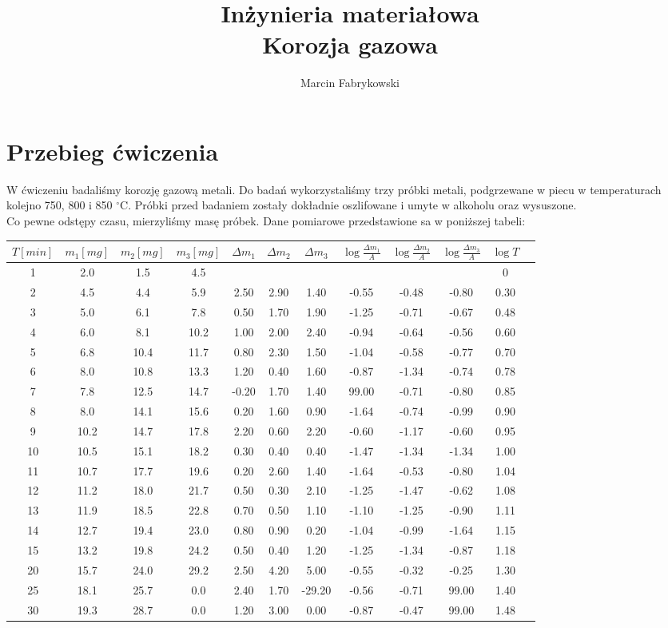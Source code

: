 \documentclass[a4paper,12pt]{article}
\author{Marcin Fabrykowski}
\title{Inżynieria materiałowa\\Korozja gazowa}
\begin{document}
\maketitle
\newpage
\section{Przebieg ćwiczenia}
W ćwiczeniu badaliśmy korozję gazową metali. Do badań wykorzystaliśmy trzy próbki metali, podgrzewane w piecu w temperaturach kolejno 750, 800 i 850 $^{\circ}$C. Próbki przed badaniem zostały dokładnie oszlifowane i umyte w alkoholu oraz wysuszone.\\
Co pewne odstępy czasu, mierzyliśmy masę próbek. Dane pomiarowe przedstawione sa w poniższej tabeli:\\
\small
\begin{tabular}{|c|c|c|c|c|c|c|c|c|c|c|c|}
\hline
$T[min]$&$m_1[mg]$&$m_2[mg]$&$m_3[mg]$&$\Delta m_1$&$\Delta m_2$&$\Delta m_3$&$\log\frac{\Delta m_1}{A}$&$\log\frac{\Delta m_2}{A}$&$\log\frac{\Delta m_3}{A}$&$\log T$\\
\hline
1&2.0&1.5&4.5&&&&&&&0\\
2&4.5&4.4&5.9&2.50&2.90&1.40&-0.55&-0.48&-0.80&0.30\\
3&5.0&6.1&7.8&0.50&1.70&1.90&-1.25&-0.71&-0.67&0.48\\
4&6.0&8.1&10.2&1.00&2.00&2.40&-0.94&-0.64&-0.56&0.60\\
5&6.8&10.4&11.7&0.80&2.30&1.50&-1.04&-0.58&-0.77&0.70\\
6&8.0&10.8&13.3&1.20&0.40&1.60&-0.87&-1.34&-0.74&0.78\\
7&7.8&12.5&14.7&-0.20&1.70&1.40&99.00&-0.71&-0.80&0.85\\
8&8.0&14.1&15.6&0.20&1.60&0.90&-1.64&-0.74&-0.99&0.90\\
9&10.2&14.7&17.8&2.20&0.60&2.20&-0.60&-1.17&-0.60&0.95\\
10&10.5&15.1&18.2&0.30&0.40&0.40&-1.47&-1.34&-1.34&1.00\\
11&10.7&17.7&19.6&0.20&2.60&1.40&-1.64&-0.53&-0.80&1.04\\
12&11.2&18.0&21.7&0.50&0.30&2.10&-1.25&-1.47&-0.62&1.08\\
13&11.9&18.5&22.8&0.70&0.50&1.10&-1.10&-1.25&-0.90&1.11\\
14&12.7&19.4&23.0&0.80&0.90&0.20&-1.04&-0.99&-1.64&1.15\\
15&13.2&19.8&24.2&0.50&0.40&1.20&-1.25&-1.34&-0.87&1.18\\
20&15.7&24.0&29.2&2.50&4.20&5.00&-0.55&-0.32&-0.25&1.30\\
25&18.1&25.7&0.0&2.40&1.70&-29.20&-0.56&-0.71&99.00&1.40\\
30&19.3&28.7&0.0&1.20&3.00&0.00&-0.87&-0.47&99.00&1.48\\
\hline
\end{tabular}
\end{document}
